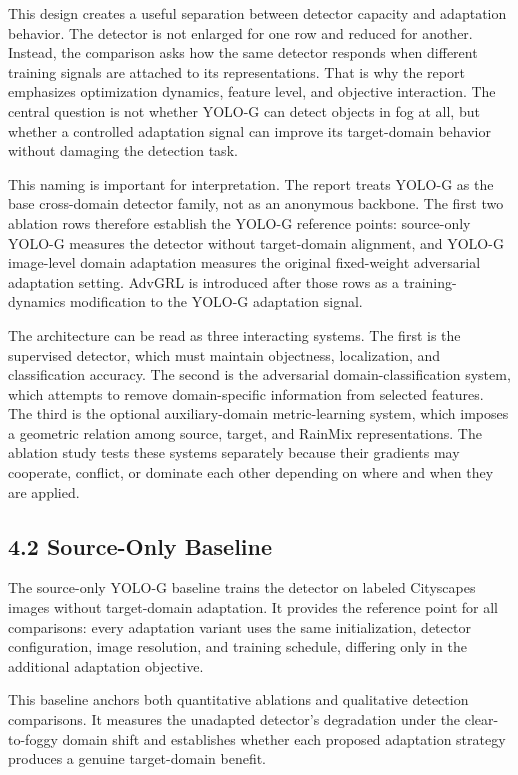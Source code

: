 \documentclass[
  11pt,
]{article}
\begin{document}
This design creates a useful separation between detector capacity and
adaptation behavior. The detector is not enlarged for one row and
reduced for another. Instead, the comparison asks how the same detector
responds when different training signals are attached to its
representations. That is why the report emphasizes optimization
dynamics, feature level, and objective interaction. The central question
is not whether YOLO-G can detect objects in fog at all, but whether a
controlled adaptation signal can improve its target-domain behavior
without damaging the detection task.

This naming is important for interpretation. The report treats YOLO-G as
the base cross-domain detector family, not as an anonymous backbone. The
first two ablation rows therefore establish the YOLO-G reference points:
source-only YOLO-G measures the detector without target-domain
alignment, and YOLO-G image-level domain adaptation measures the
original fixed-weight adversarial adaptation setting. AdvGRL is
introduced after those rows as a training-dynamics modification to the
YOLO-G adaptation signal.

The architecture can be read as three interacting systems. The first is
the supervised detector, which must maintain objectness, localization,
and classification accuracy. The second is the adversarial
domain-classification system, which attempts to remove domain-specific
information from selected features. The third is the optional
auxiliary-domain metric-learning system, which imposes a geometric
relation among source, target, and RainMix representations. The ablation
study tests these systems separately because their gradients may
cooperate, conflict, or dominate each other depending on where and when
they are applied.

\hypertarget{source-only-baseline}{%
\subsection{4.2 Source-Only Baseline}\label{source-only-baseline}}

The source-only YOLO-G baseline trains the detector on labeled
Cityscapes images without target-domain adaptation. It provides the
reference point for all comparisons: every adaptation variant uses the
same initialization, detector configuration, image resolution, and
training schedule, differing only in the additional adaptation
objective.

This baseline anchors both quantitative ablations and qualitative
detection comparisons. It measures the unadapted detector's degradation
under the clear-to-foggy domain shift and establishes whether each
proposed adaptation strategy produces a genuine target-domain benefit.
\end{document}
